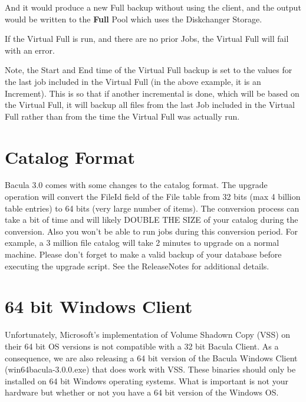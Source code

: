 And it would produce a new Full backup without using the client, and the output
would be written to the {\bf Full} Pool which uses the Diskchanger Storage.

If the Virtual Full is run, and there are no prior Jobs, the Virtual Full will
fail with an error.

Note, the Start and End time of the Virtual Full backup is set to the
values for the last job included in the Virtual Full (in the above example,
it is an Increment). This is so that if another incremental is done, which
will be based on the Virtual Full, it will backup all files from the
last Job included in the Virtual Full rather than from the time the Virtual
Full was actually run.



\section{Catalog Format}
Bacula 3.0 comes with some changes to the catalog format.  The upgrade
operation will convert the FileId field of the File table from 32 bits (max 4
billion table entries) to 64 bits (very large number of items).  The
conversion process can take a bit of time and will likely DOUBLE THE SIZE of
your catalog during the conversion.  Also you won't be able to run jobs during
this conversion period.  For example, a 3 million file catalog will take 2
minutes to upgrade on a normal machine.  Please don't forget to make a valid
backup of your database before executing the upgrade script. See the 
ReleaseNotes for additional details.

\section{64 bit Windows Client}
Unfortunately, Microsoft's implementation of Volume Shadown Copy (VSS) on
their 64 bit OS versions is not compatible with a 32 bit Bacula Client.
As a consequence, we are also releasing a 64 bit version of the Bacula 
Windows Client (win64bacula-3.0.0.exe) that does work with VSS. 
These binaries should only be installed on 64 bit Windows operating systems.
What is important is not your hardware but whether or not you have
a 64 bit version of the Windows OS.  

